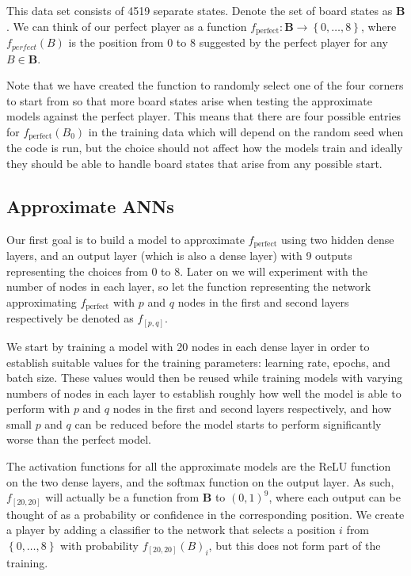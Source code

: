 \documentclass{somasmsc}
\begin{document}
This data set consists of 4519 separate states. Denote the set of board states as $\mathbf{B}$. We can think of our perfect player as a function $f_{\text{perfect}} : \mathbf{B} \rightarrow \left\{0, \dots, 8\right\}$, where $f_{perfect}\left(B\right)$ is the position from 0 to 8 suggested by the perfect player for any $B \in \mathbf{B}$.

Note that we have created the function to randomly select one of the four corners to start from so that more board states arise when testing the approximate models against the perfect player. This means that there are four possible entries for $f_{\text{perfect}}\left(B_0\right)$ in the training data which will depend on the random seed when the code is run, but the choice should not affect how the models train and ideally they should be able to handle board states that arise from any possible start.

\subsection{Approximate ANNs}

Our first goal is to build a model to approximate $f_{\text{perfect}}$ using two hidden dense layers, and an output layer (which is also a dense layer) with 9 outputs representing the choices from 0 to 8. Later on we will experiment with the number of nodes in each layer, so let the function representing the network approximating $f_{\text{perfect}}$ with $p$ and $q$ nodes in the first and second layers respectively be denoted as $f_{\left[p,q\right]}$.

We start by training a model with 20 nodes in each dense layer in order to establish suitable values for the training parameters: learning rate, epochs, and batch size. These values would then be reused while training models with varying numbers of nodes in each layer to establish roughly how well the model is able to perform with $p$ and $q$ nodes in the first and second layers respectively, and how small $p$ and $q$ can be reduced before the model starts to perform significantly worse than the perfect model.

The activation functions for all the approximate models are the ReLU function on the two dense layers, and the softmax function on the output layer. As such, $f_{\left[20,20\right]}$ will actually be a function from $\mathbf{B}$ to $\left(0, 1\right)^9$, where each output can be thought of as a probability or confidence in the corresponding position. We create a player by adding a classifier to the network that selects a position $i$ from $\left\{0, \dots, 8\right\}$ with probability $f_{\left[20,20\right]}\left(B\right)_i$, but this does not form part of the training.
\end{document}
